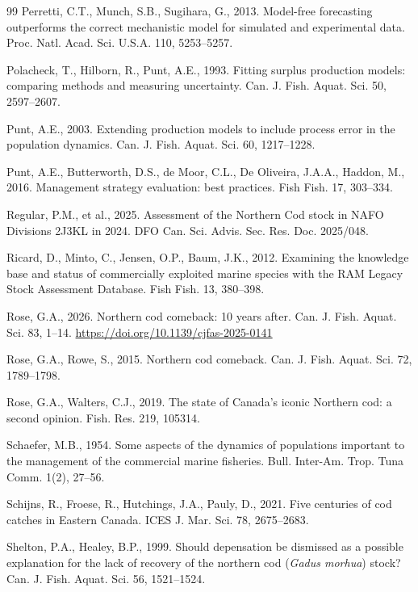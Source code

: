 \documentclass[preprint,11pt,authoryear]{elsarticle}
\theoremstyle{definition}
\theoremstyle{remark}
\begin{document}
\begin{thebibliography}{99}
Perretti, C.T., Munch, S.B., Sugihara, G., 2013. Model-free forecasting outperforms the correct mechanistic model for simulated and experimental data. Proc. Natl. Acad. Sci. U.S.A. 110, 5253--5257.

Polacheck, T., Hilborn, R., Punt, A.E., 1993. Fitting surplus production models: comparing methods and measuring uncertainty. Can. J. Fish. Aquat. Sci. 50, 2597--2607.

Punt, A.E., 2003. Extending production models to include process error in the population dynamics. Can. J. Fish. Aquat. Sci. 60, 1217--1228.

Punt, A.E., Butterworth, D.S., de Moor, C.L., De Oliveira, J.A.A., Haddon, M., 2016. Management strategy evaluation: best practices. Fish Fish. 17, 303--334.

Regular, P.M., et al., 2025. Assessment of the Northern Cod stock in NAFO Divisions 2J3KL in 2024. DFO Can. Sci. Advis. Sec. Res. Doc. 2025/048.

Ricard, D., Minto, C., Jensen, O.P., Baum, J.K., 2012. Examining the knowledge base and status of commercially exploited marine species with the RAM Legacy Stock Assessment Database. Fish Fish. 13, 380--398.

Rose, G.A., 2026. Northern cod comeback: 10 years after. Can. J. Fish. Aquat. Sci. 83, 1--14. \url{https://doi.org/10.1139/cjfas-2025-0141}

Rose, G.A., Rowe, S., 2015. Northern cod comeback. Can. J. Fish. Aquat. Sci. 72, 1789--1798.

Rose, G.A., Walters, C.J., 2019. The state of Canada's iconic Northern cod: a second opinion. Fish. Res. 219, 105314.

Schaefer, M.B., 1954. Some aspects of the dynamics of populations important to the management of the commercial marine fisheries. Bull. Inter-Am. Trop. Tuna Comm. 1(2), 27--56.

Schijns, R., Froese, R., Hutchings, J.A., Pauly, D., 2021. Five centuries of cod catches in Eastern Canada. ICES J. Mar. Sci. 78, 2675--2683.

Shelton, P.A., Healey, B.P., 1999. Should depensation be dismissed as a possible explanation for the lack of recovery of the northern cod (\emph{Gadus morhua}) stock? Can. J. Fish. Aquat. Sci. 56, 1521--1524.


\end{thebibliography}
\end{document}
